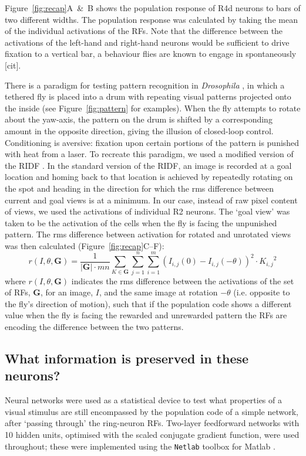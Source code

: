 Figure~\ref{fig:recap}A~\&~B shows the population response of R4d neurons to bars of two different widths.
The population response was calculated by taking the mean of the individual activations of the \acp{RF}.
Note that the difference between the activations of the left-hand and right-hand neurons would be sufficient to drive fixation to a vertical bar, a behaviour flies are known to engage in spontaneously [cit].

There is a paradigm for testing pattern recognition in \emph{Drosophila} \cite{Pan2009,Liu2006,Ernst1999}, in which a tethered fly is placed into a drum with repeating visual patterns projected onto the inside (see Figure~\ref{fig:pattern} for examples).
When the fly attempts to rotate about the yaw-axis, the pattern on the drum is shifted by a corresponding amount in the opposite direction, giving the illusion of closed-loop control.
Conditioning is aversive: fixation upon certain portions of the pattern is punished with heat from a laser.
To recreate this paradigm, we used a modified version of the \ac{RIDF} \cite{Philippides2011,Zeil2003}.
In the standard version of the \ac{RIDF}, an image is recorded at a goal location and homing back to that location is achieved by repeatedly rotating on the spot and heading in the direction for which the \ac{rms} difference between current and goal views is at a minimum.
In our case, instead of raw pixel content of views, we used the activations of individual R2 neurons.
The `goal view' was taken to be the activation of the cells when the fly is facing the unpunished pattern.
The \ac{rms} difference between activation for rotated and unrotated views was then calculated (Figure~\ref{fig:recap}C--F):
$$
r(I,\theta,\mathbf{G}) = \frac{1}{|\mathbf{G}|\cdot mn} {\sum\limits_{K \in \mathbf{G}} \sum\limits^n_{j=1} \sum\limits^m_{i=1} (I_{i,j}(0)-I_{i,j}(-\theta))^2 \cdot {K_{i,j}}^2}
$$
where $r(I,\theta,\mathbf{G})$ indicates the \ac{rms} difference between the activations of the set of \acp{RF}, $\mathbf{G}$, for an image, $I$, and the same image at rotation $-\theta$ (i.e. opposite to the fly's direction of motion), such that if the population code shows a different value when the fly is facing the rewarded and unrewarded pattern the \acp{RF} are encoding the difference between the two patterns.

\subsection{What information is preserved in these neurons?}
Neural networks were used as a statistical device to test what properties of a visual stimulus are still encompassed by the population code of a simple network, after `passing through' the ring-neuron \acp{RF}.
Two-layer feedforward networks with 10 hidden units, optimised with the scaled conjugate gradient function, were used throughout; these were implemented using the \texttt{Netlab} toolbox for Matlab \cite{netlab}.

